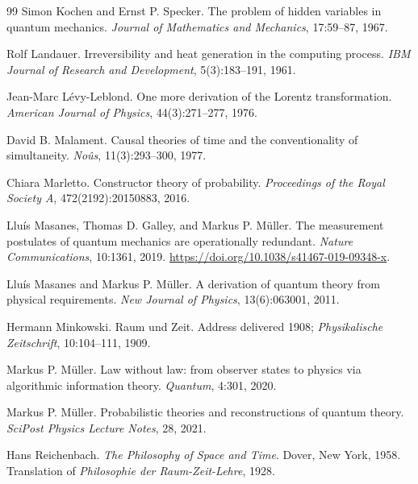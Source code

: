 \documentclass[11pt,a4paper]{article}
\theoremstyle{remark}\newtheorem{remark}[definition]{Remark}
\begin{document}
\begin{thebibliography}{99}
Simon Kochen and Ernst P. Specker.
\newblock The problem of hidden variables in quantum mechanics.
\newblock \emph{Journal of Mathematics and Mechanics}, 17:59--87, 1967.

Rolf Landauer.
\newblock Irreversibility and heat generation in the computing process.
\newblock \emph{IBM Journal of Research and Development}, 5(3):183--191, 1961.

Jean-Marc L\'evy-Leblond.
\newblock One more derivation of the Lorentz transformation.
\newblock \emph{American Journal of Physics}, 44(3):271--277, 1976.

David B. Malament.
\newblock Causal theories of time and the conventionality of simultaneity.
\newblock \emph{No\^us}, 11(3):293--300, 1977.

Chiara Marletto.
\newblock Constructor theory of probability.
\newblock \emph{Proceedings of the Royal Society A}, 472(2192):20150883, 2016.

Llu\'is Masanes, Thomas D. Galley, and Markus P. M\"uller.
\newblock The measurement postulates of quantum mechanics are operationally redundant.
\newblock \emph{Nature Communications}, 10:1361, 2019.
\newblock \url{https://doi.org/10.1038/s41467-019-09348-x}.

Llu\'is Masanes and Markus P. M\"uller.
\newblock A derivation of quantum theory from physical requirements.
\newblock \emph{New Journal of Physics}, 13(6):063001, 2011.

Hermann Minkowski.
\newblock Raum und Zeit.
\newblock Address delivered 1908; \emph{Physikalische Zeitschrift}, 10:104--111, 1909.

Markus P. M\"uller.
\newblock Law without law: from observer states to physics via algorithmic information theory.
\newblock \emph{Quantum}, 4:301, 2020.

Markus P. M\"uller.
\newblock Probabilistic theories and reconstructions of quantum theory.
\newblock \emph{SciPost Physics Lecture Notes}, 28, 2021.

Hans Reichenbach.
\newblock \emph{The Philosophy of Space and Time}.
\newblock Dover, New York, 1958.
\newblock Translation of \emph{Philosophie der Raum-Zeit-Lehre}, 1928.


\end{thebibliography}
\end{document}
